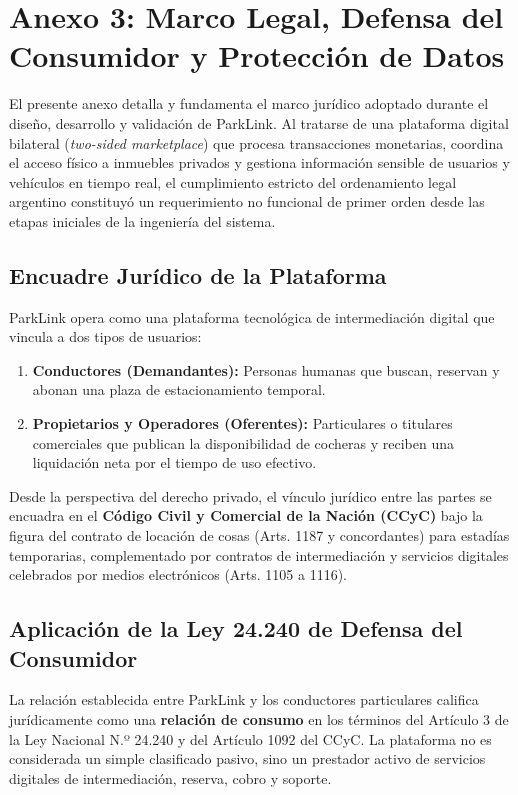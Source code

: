 \newpage
\section{Anexo 3: Marco Legal, Defensa del Consumidor y Protección de Datos}\label{anexo:legal}

El presente anexo detalla y fundamenta el marco jurídico adoptado durante el diseño, desarrollo y validación de ParkLink. Al tratarse de una plataforma digital bilateral (\textit{two-sided marketplace}) que procesa transacciones monetarias, coordina el acceso físico a inmuebles privados y gestiona información sensible de usuarios y vehículos en tiempo real, el cumplimiento estricto del ordenamiento legal argentino constituyó un requerimiento no funcional de primer orden desde las etapas iniciales de la ingeniería del sistema.

\subsection{Encuadre Jurídico de la Plataforma}

ParkLink opera como una plataforma tecnológica de intermediación digital que vincula a dos tipos de usuarios:
\begin{enumerate}
    \item \textbf{Conductores (Demandantes):} Personas humanas que buscan, reservan y abonan una plaza de estacionamiento temporal.
    \item \textbf{Propietarios y Operadores (Oferentes):} Particulares o titulares comerciales que publican la disponibilidad de cocheras y reciben una liquidación neta por el tiempo de uso efectivo.
\end{enumerate}

Desde la perspectiva del derecho privado, el vínculo jurídico entre las partes se encuadra en el \textbf{Código Civil y Comercial de la Nación (CCyC)} \autocite{cicc_argentina} bajo la figura del contrato de locación de cosas (Arts. 1187 y concordantes) para estadías temporarias, complementado por contratos de intermediación y servicios digitales celebrados por medios electrónicos (Arts. 1105 a 1116).

\subsection{Aplicación de la Ley 24.240 de Defensa del Consumidor}

La relación establecida entre ParkLink y los conductores particulares califica jurídicamente como una \textbf{relación de consumo} en los términos del Artículo 3 de la Ley Nacional N.º 24.240 \autocite{ley24240} y del Artículo 1092 del CCyC. La plataforma no es considerada un simple clasificado pasivo, sino un prestador activo de servicios digitales de intermediación, reserva, cobro y soporte. 

